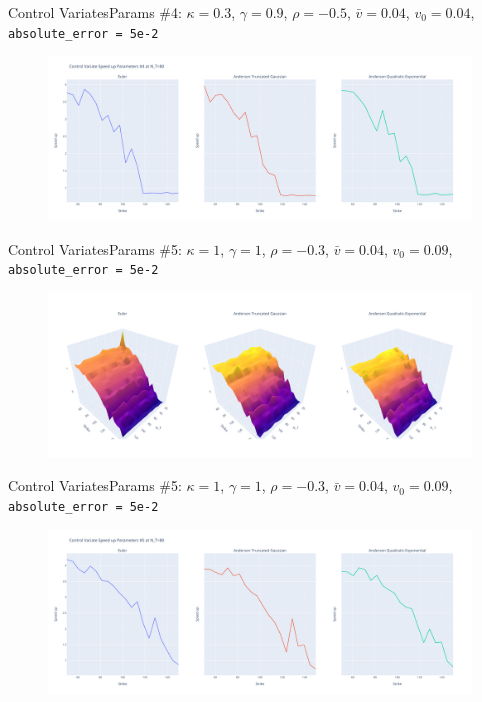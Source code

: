     \begin{frame}{Control Variates}{Params \#4: $\kappa = 0.3$, $\gamma = 0.9$, $\rho = -0.5$, $\bar v = 0.04$, $v_0 = 0.04$, \texttt{absolute\_error = 5e-2}}
        \begin{figure}
            \includegraphics[width=\textwidth]{part5/pictures/pot_4.pdf}
        \end{figure}
    \end{frame}

    \begin{frame}{Control Variates}{Params \#5: $\kappa = 1$, $\gamma = 1$, $\rho = -0.3$, $\bar v = 0.04$, $v_0 = 0.09$, \texttt{absolute\_error = 5e-2}}
        \begin{figure}
            \includegraphics[width=\textwidth]{part5/pictures/surf_5.pdf}
        \end{figure}
    \end{frame}

    \begin{frame}{Control Variates}{Params \#5: $\kappa = 1$, $\gamma = 1$, $\rho = -0.3$, $\bar v = 0.04$, $v_0 = 0.09$, \texttt{absolute\_error = 5e-2}}
        \begin{figure}
            \includegraphics[width=\textwidth]{part5/pictures/pot_5.pdf}
        \end{figure}
    \end{frame}

